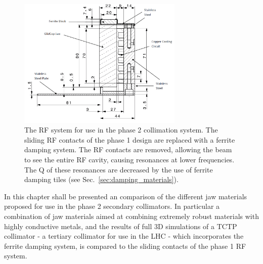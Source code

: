 \begin{figure}
\begin{center}
\includegraphics[width=0.7\textwidth]{LHC_Collimation_Upgrades/figures/cu-geo.png}
\end{center}
\caption{The RF system for use in the phase 2 collimation system. The sliding RF contacts of the phase 1 design are replaced with a ferrite damping system. The RF contacts are removed, allowing the beam to see the entire RF cavity, causing resonances at lower frequencies. The Q of these resonances are decreased by the use of ferrite damping tiles (see Sec.~\ref{sec:damping_materials}).}
\label{fig:phase-2-rf-system}
\end{figure}

In this chapter shall be presented an comparison of the different jaw materials proposed for use in the phase 2 secondary collimators. In particular a combination of jaw materials aimed at combining extremely robust materials with highly conductive metals, and the results of full 3D simulations of a TCTP collimator - a tertiary collimator for use in the LHC - which incorporates the ferrite damping system, is compared to the sliding contacts of the phase 1 RF system. 



%
%
%
%
%
%


